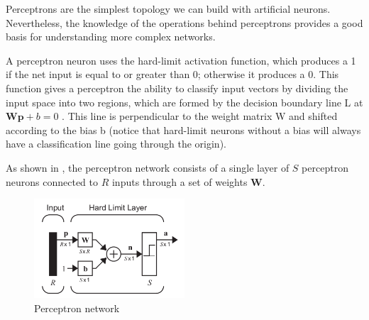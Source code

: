 
\label{subsec:ANN:perceptron}

Perceptrons are the simplest topology we can build with artificial neurons. 
Nevertheless, the knowledge of the operations behind perceptrons provides a good
basis for understanding more complex networks.

A perceptron neuron uses the hard-limit activation function, which produces a 1 if the net input is equal to or greater than 0; otherwise it produces a 0. 
This function gives a perceptron the ability to classify input vectors by dividing the input space into two regions, which are formed by the decision boundary line L at $\mathbf{Wp} + b = 0$ \cite{demuth2008neural}. 
This line is perpendicular to the weight matrix W and shifted according to the bias b 
(notice that hard-limit neurons without a bias will always have a classification line going through the origin).

As shown in , the perceptron network consists of a single layer of 
$S$ perceptron neurons connected to $R$ inputs through a set of weights $\mathbf{W}$.

\begin{figure}[!ht]
\centering
\includegraphics[width=0.5\textwidth]{images/perceptron.png}
\caption{Perceptron network}
\label{fig:perceptron}
\end{figure}



